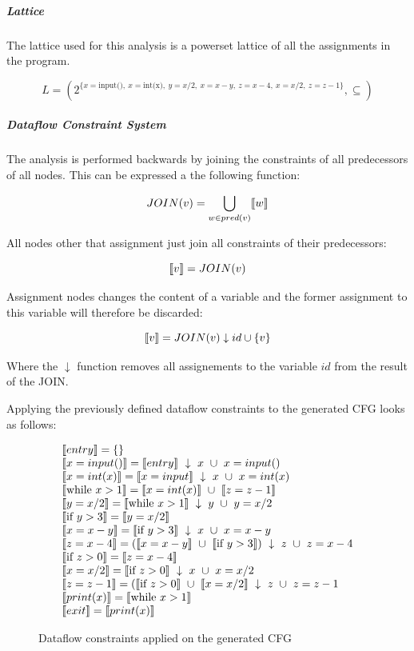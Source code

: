 \subparagraph{Lattice}
The lattice used for this analysis is a powerset lattice of all the assignments in the program.

\[ L = ( 2^{ \{x = \text{input()}, ~ x = \text{int(x)}, ~ y = x/2, ~ x = x-y, ~ z = x-4, ~ x = x/2, ~ z = z-1 \} } , \subseteq ) \]


\subparagraph{Dataflow Constraint System}
The analysis is performed backwards by joining the constraints of all predecessors of all nodes.
This can be expressed a the following function:

\[ JOIN(v) = \bigcup_{ w \in pred(v)} \llbracket w \rrbracket \]

All nodes other that assignment just join all constraints of their predecessors:

\[ \llbracket v \rrbracket = JOIN(v) \]

Assignment nodes changes the content of a variable and the former assignment to this variable will therefore be discarded:

\[ \llbracket v \rrbracket = JOIN(v) \downarrow id \cup \{ v \} \]

Where the $\downarrow$ function removes all assignements to the variable $id$ from the result of the JOIN.

Applying the previously defined dataflow constraints to the generated CFG looks as follows:

\begin{figure}[H]
\[
\begin{array}{l}
  \llbracket entry \rrbracket = \{\}\\
  \llbracket x = input() \rrbracket = \llbracket entry \rrbracket ~ \downarrow ~ x ~ \cup ~ x = input()\\
  \llbracket x = int(x) \rrbracket = \llbracket x = input \rrbracket ~ \downarrow ~ x ~ \cup ~ x = int(x)\\
  \llbracket \text{while } x > 1 \rrbracket = \llbracket x = int(x) \rrbracket ~ \cup ~ \llbracket z = z - 1 \rrbracket\\
  \llbracket  y = x / 2 \rrbracket = \llbracket \text{while } x > 1 \rrbracket ~ \downarrow ~ y ~ \cup ~ y = x / 2\\
  \llbracket \text{if } y > 3 \rrbracket = \llbracket  y = x / 2 \rrbracket\\
  \llbracket  x = x-y \rrbracket = \llbracket \text{if } y > 3 \rrbracket ~ \downarrow ~ x ~ \cup ~ x = x-y\\
  \llbracket  z = x-4 \rrbracket = (\llbracket x = x-y \rrbracket ~ \cup ~ \llbracket \text{if } y > 3 \rrbracket) ~ \downarrow ~ z ~ \cup ~ z = x-4\\
  \llbracket \text{if } z > 0 \rrbracket = \llbracket z = x - 4 \rrbracket\\
  \llbracket x = x / 2 \rrbracket = \llbracket \text{if } z > 0 \rrbracket ~ \downarrow ~ x ~ \cup ~ x = x/2\\
  \llbracket z = z - 1 \rrbracket = (\llbracket \text{if } z > 0 \rrbracket ~ \cup ~ \llbracket x = x / 2 \rrbracket ~ \downarrow ~ z ~ \cup ~ z = z - 1\\
  \llbracket print(x) \rrbracket = \llbracket \text{while } x > 1 \rrbracket\\
  \llbracket exit \rrbracket = \llbracket print(x) \rrbracket
\end{array}
\]
\caption{Dataflow constraints applied on the generated CFG}
\end{figure}


